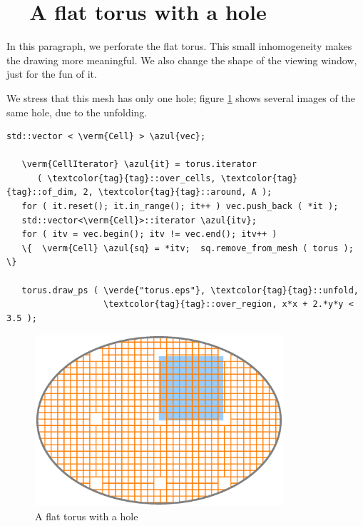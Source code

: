 \section{~~A flat torus with a hole}\label{\numb section 7.\numb parag 6}

In this paragraph, we perforate the flat torus.
This small inhomogeneity makes the drawing more meaningful.
We also change the shape of the viewing window, just for the fun of it.

We stress that this mesh has only one hole; figure \ref{\numb section 7.\numb fig 2}
shows several images of the same hole, due to the unfolding.

\begin{Verbatim}[commandchars=\\\{\},formatcom=\small\tt,frame=single,
   label=parag-\ref{\numb section 7.\numb parag 6}.cpp,rulecolor=\color{coment},
   baselinestretch=0.94,framesep=2mm                                            ]
   std::vector < \verm{Cell} > \azul{vec};

   \verm{CellIterator} \azul{it} = torus.iterator
      ( \textcolor{tag}{tag}::over_cells, \textcolor{tag}{tag}::of_dim, 2, \textcolor{tag}{tag}::around, A );
   for ( it.reset(); it.in_range(); it++ ) vec.push_back ( *it );
   std::vector<\verm{Cell}>::iterator \azul{itv};
   for ( itv = vec.begin(); itv != vec.end(); itv++ )
   \{  \verm{Cell} \azul{sq} = *itv;  sq.remove_from_mesh ( torus );  \}

   torus.draw_ps ( \verde{"torus.eps"}, \textcolor{tag}{tag}::unfold,
                   \textcolor{tag}{tag}::over_region, x*x + 2.*y*y < 3.5 );
\end{Verbatim}

\begin{figure}[ht] \centering
  \includegraphics[width=92mm]{flat-torus-2.eps}
  \caption{A flat torus with a hole}
  \label{\numb section 7.\numb fig 2}
\end{figure}

